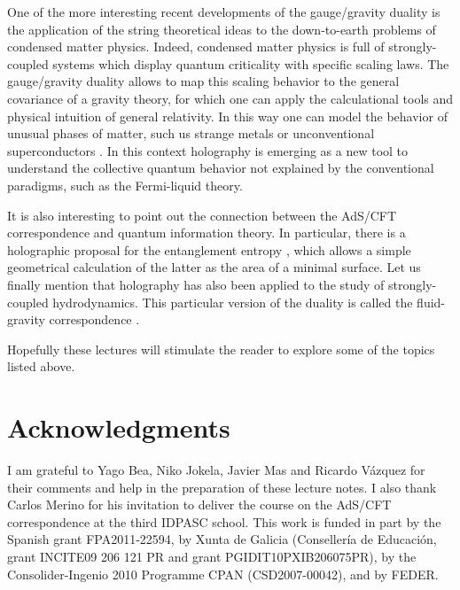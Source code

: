 \documentclass[12pt,notitlepage,a4paper]{article}
\begin{document}
One of the more interesting  recent developments of the gauge/gravity duality is the application of the string theoretical ideas to the down-to-earth problems of condensed matter physics. Indeed, condensed matter physics is full of strongly-coupled systems which display quantum criticality with specific scaling laws. The gauge/gravity duality allows to map this scaling behavior to the general covariance of a gravity theory, for which one can apply the calculational tools and physical intuition of general relativity. 
In this way one can  model the behavior of unusual phases of matter, such us strange metals or unconventional superconductors \cite{Hartnoll:2009sz, Sachdev:2010ch,Sachdev:2011wg,Green:2013fqa}. In this context holography is emerging as a new tool to understand the collective quantum behavior not explained by the conventional paradigms, such as the Fermi-liquid theory. 

It is also interesting to point out the connection between the AdS/CFT correspondence and quantum information theory. In particular, there is a holographic proposal for the entanglement entropy \cite{Nishioka:2009un,Takayanagi:2012kg}, which allows a simple geometrical calculation of the latter as the area of a minimal surface. Let us finally mention that holography has also been applied to the study of strongly-coupled hydrodynamics. This particular version of the duality is called the fluid-gravity correspondence \cite{Rangamani:2009xk,Hubeny:2011hd}. 


Hopefully these lectures will stimulate the reader to explore some of the topics listed above. 

%
\section*{Acknowledgments}


I am grateful to Yago Bea,  Niko Jokela,  Javier Mas and Ricardo V\'azquez for their comments and help in the preparation of these lecture notes. I also thank Carlos Merino for his invitation to deliver the course on the AdS/CFT correspondence at the third IDPASC school.  This  work is funded in part by the Spanish grant 
FPA2011-22594,  by Xunta de Galicia (Conseller{\'i}a de Educaci\'on, grant 
INCITE09 206 121 PR and grant PGIDIT10PXIB206075PR),  by the 
Consolider-Ingenio 2010 Programme CPAN (CSD2007-00042), and by FEDER.

%
%
%
\end{document}

